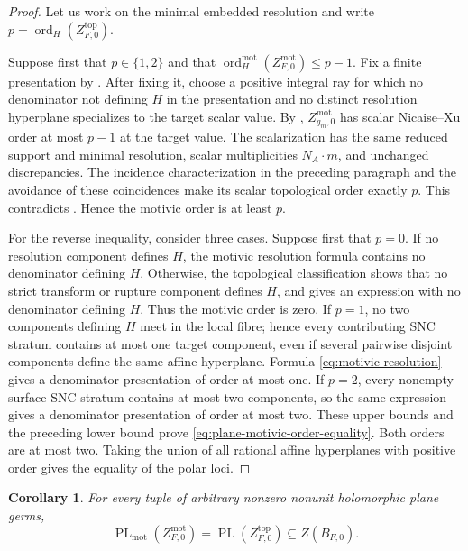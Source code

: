 \documentclass[12pt]{amsart}
\numberwithin{equation}{section}
\theoremstyle{plain}
\newtheorem{corollary}[theorem]{Corollary}
\theoremstyle{definition}
\theoremstyle{remark}
\theoremstyle{definition}
\DeclareMathOperator{\PL}{PL}
\DeclareMathOperator{\ord}{ord}
\newcommand{\motzeta}{Z^{\mathrm{mot}}_{F,0}}
\begin{document}
\begin{proof}
Let us work on the minimal embedded resolution and write $p=\ord_H(Z^{\mathrm{top}}_{F,0})$.

Suppose first that $p\in\{1,2\}$ and that $\ord_H^{\mathrm{mot}}(\motzeta)\leq p-1$. Fix a finite presentation by . After fixing it, choose a positive integral ray for which no denominator not defining $H$ in the presentation and no distinct resolution hyperplane specializes to the target scalar value. By , $Z^{\mathrm{mot}}_{g_m,0}$ has scalar Nicaise--Xu order at most $p-1$ at the target value. The scalarization has the same reduced support and minimal resolution, scalar multiplicities $N_A\cdot m$, and unchanged discrepancies. The incidence characterization in the preceding paragraph and the avoidance of these coincidences make its scalar topological order exactly $p$. This contradicts . Hence the motivic order is at least $p$.

For the reverse inequality, consider three cases. Suppose first that $p=0$. If no resolution component defines $H$, the motivic resolution formula contains no denominator defining $H$. Otherwise, the topological classification shows that no strict transform or rupture component defines $H$, and  gives an expression with no denominator defining $H$. Thus the motivic order is zero. If $p=1$, no two components defining $H$ meet in the local fibre; hence every contributing SNC stratum contains at most one target component, even if several pairwise disjoint components define the same affine hyperplane. Formula \eqref{eq:motivic-resolution} gives a denominator presentation of order at most one. If $p=2$, every nonempty surface SNC stratum contains at most two components, so the same expression gives a denominator presentation of order at most two. These upper bounds and the preceding lower bound prove \eqref{eq:plane-motivic-order-equality}. Both orders are at most two. Taking the union of all rational affine hyperplanes with positive order gives the equality of the polar loci.
\end{proof}

\begin{corollary}\label{cor:plane-motivic-smc}
For every tuple of arbitrary nonzero nonunit holomorphic plane germs,
\begin{equation*}
\PL_{\mathrm{mot}}(\motzeta)=\PL(Z^{\mathrm{top}}_{F,0})\subseteq Z(B_{F,0}).
\end{equation*}
\end{corollary}
\end{document}
